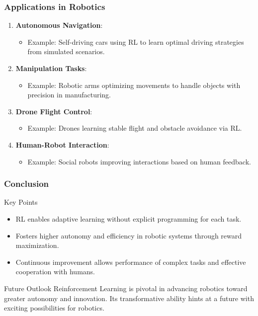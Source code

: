 \documentclass{beamer}
\begin{document}
\begin{frame}[fragile]
    \frametitle{Applications in Robotics}
    \begin{enumerate}
        \item \textbf{Autonomous Navigation}:
        \begin{itemize}
            \item Example: Self-driving cars using RL to learn optimal driving strategies from simulated scenarios.
        \end{itemize}
        
        \item \textbf{Manipulation Tasks}:
        \begin{itemize}
            \item Example: Robotic arms optimizing movements to handle objects with precision in manufacturing.
        \end{itemize}
        
        \item \textbf{Drone Flight Control}:
        \begin{itemize}
            \item Example: Drones learning stable flight and obstacle avoidance via RL.
        \end{itemize}
        
        \item \textbf{Human-Robot Interaction}:
        \begin{itemize}
            \item Example: Social robots improving interactions based on human feedback.
        \end{itemize}
    \end{enumerate}
\end{frame}

\begin{frame}[fragile]
    \frametitle{Conclusion}
    \begin{block}{Key Points}
        \begin{itemize}
            \item RL enables adaptive learning without explicit programming for each task.
            \item Fosters higher autonomy and efficiency in robotic systems through reward maximization.
            \item Continuous improvement allows performance of complex tasks and effective cooperation with humans.
        \end{itemize}
    \end{block}
    
    \begin{block}{Future Outlook}
        Reinforcement Learning is pivotal in advancing robotics toward greater autonomy and innovation. Its transformative ability hints at a future with exciting possibilities for robotics.
    \end{block}
\end{frame}
\end{document}
